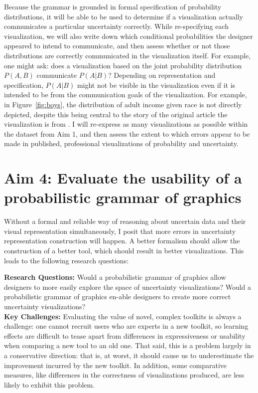 \documentclass[11pt]{article}
\begin{document}
\vspace{-1.0em}
\noindent\hrulefill

\noindent Because the grammar is grounded in formal specification of probability distributions, it will be able to be used to determine if a visualization actually communicates a particular uncertainty correctly. While re-specifying each visualization, we will also write down which conditional probabilities the designer appeared to intend to communicate, and then assess whether or not those distributions are correctly communicated in the visualization itself. For example, one might ask: does a visualization based on the joint probability distribution $P(A,B)$ communicate $P(A|B)$? Depending on representation and specification, $P(A|B)$ might not be visible in the visualization even if it is intended to be from the communication goals of the visualization. For example, in Figure~\ref{fig:boys}, the distribution of adult income given race is not directly depicted, despite this being central to the story of the original article the visualization is from \cite{badger2018extensive}. I will re-express as many visualizations as possible within the dataset from Aim 1, and then assess the extent to which errors appear to be made in published, professional visualizations of probability and uncertainty. 



\section{Aim 4: Evaluate the usability of a probabilistic grammar of graphics}

\noindent Without a formal and reliable way of reasoning about uncertain data and their visual representation simultaneously, I posit that more errors in uncertainty representation construction will happen. A better formalism should allow the construction of a better tool, which should result in better visualizations. This leads to the following research questions:


\noindent\hrulefill
\vspace{-0.5em}

\noindent\textbf{Research Questions:}
Would a probabilistic grammar of graphics allow designers to more easily explore the space of uncertainty visualizations? Would a probabilistic grammar of graphics en-able designers to create more correct uncertainty visualizations?
\\
\noindent\textbf{Key Challenges:}
Evaluating the value of novel, complex toolkits is always a challenge: one cannot recruit users who are experts in a new toolkit, so learning effects are difficult to tease apart from differences in expressiveness or usability when comparing a new tool to an old one. That said, this is a problem largely in a conservative direction: that is, at worst, it should cause us to underestimate the improvement incurred by the new toolkit. In addition, some comparative measures, like differences in the correctness of visualizations produced, are less likely to exhibit this problem.
\end{document}
